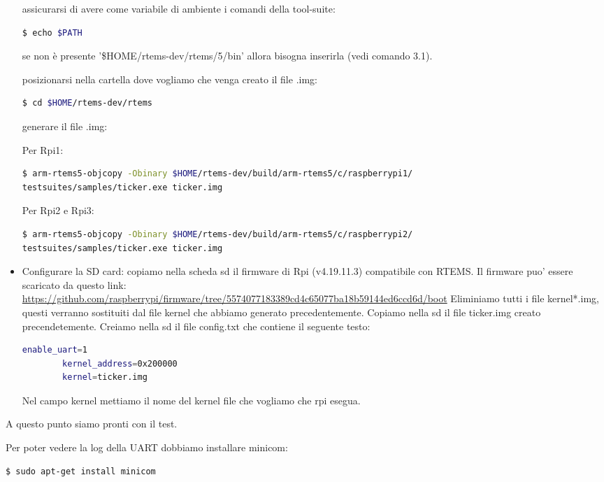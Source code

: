 \documentclass[10pt, a4paper]{article}
\begin{document}
\begin{flushleft}
\begin{itemize}
assicurarsi di avere come variabile di ambiente i comandi della tool-suite:
\begin{lstlisting}[language=bash] 
$ echo $PATH
\end{lstlisting}
se non è presente  '\$HOME/rtems-dev/rtems/5/bin' allora bisogna inserirla (vedi comando 3.1).

posizionarsi nella cartella dove vogliamo che venga creato il file .img:
\begin{lstlisting}[language=bash] 
$ cd $HOME/rtems-dev/rtems 
\end{lstlisting}		

generare il file .img:

Per Rpi1: 
\begin{lstlisting}[language=bash] 
$ arm-rtems5-objcopy -Obinary $HOME/rtems-dev/build/arm-rtems5/c/raspberrypi1/ 
testsuites/samples/ticker.exe ticker.img
\end{lstlisting}
Per Rpi2 e Rpi3: 
\begin{lstlisting}[language=bash ] 
$ arm-rtems5-objcopy -Obinary $HOME/rtems-dev/build/arm-rtems5/c/raspberrypi2/
testsuites/samples/ticker.exe ticker.img
\end{lstlisting}

\item Configurare la SD card:
copiamo nella scheda sd il firmware di Rpi (v4.19.11.3) compatibile con RTEMS. 
Il firmware puo' essere scaricato da questo link:  \\
\small\url{https://github.com/raspberrypi/firmware/tree/5574077183389cd4c65077ba18b59144ed6ccd6d/boot}
Eliminiamo tutti i file kernel*.img, questi verranno sostituiti dal file 
kernel che abbiamo generato precedentemente.
Copiamo nella sd il file ticker.img creato precendetemente.
Creiamo nella sd il file config.txt che contiene il seguente testo:
\begin{lstlisting}[language=bash ] 
		enable_uart=1
		kernel_address=0x200000
 		kernel=ticker.img 
\end{lstlisting}
Nel campo kernel mettiamo il nome del kernel file che vogliamo che rpi esegua.
\end{itemize}
	
\newpage
 	 
A questo punto siamo pronti con il test.

Per poter vedere la log della UART dobbiamo installare minicom:
\begin{lstlisting}[language=bash] 
$ sudo apt-get install minicom
\end{lstlisting}


\end{flushleft}
\end{document}
